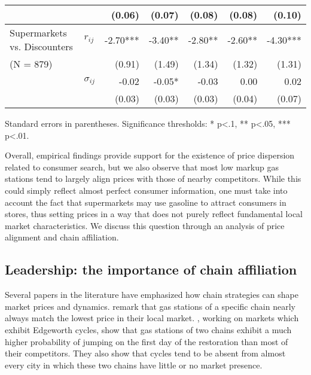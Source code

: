 \documentclass[english]{article}
\begin{document}
\begin{table}
\begin{threeparttable}
\begin{tabular}{rrrrrrr}
          &       & (0.06) & (0.07) & (0.08) & (0.08) & (0.10) \\
    \midrule
    \multicolumn{1}{l}{Supermarkets vs. Discounters} & \multicolumn{1}{l}{$r_{ij}$} & -2.70*** & -3.40** & -2.80** & -2.60** & -4.30*** \\
    \multicolumn{1}{l}{(N = 879)} &       & (0.91) & (1.49) & (1.34) & (1.32) & (1.31) \\
          & \multicolumn{1}{l}{$\sigma_{ij}$} & -0.02 & -0.05* & -0.03 & 0.00  & 0.02 \\
          &       & (0.03) & (0.03) & (0.03) & (0.04) & (0.07) \\
    \bottomrule
    \bottomrule
\end{tabular}
\begin{tablenotes}
      \small
      \item Standard errors in parentheses. Significance thresholds: * p<.1, ** p<.05, *** p<.01.
\end{tablenotes}
\end{threeparttable}
\end{table}

Overall, empirical findings provide support for the existence of price dispersion related to consumer search, but we also observe that most low markup gas stations tend to largely align prices with those of nearby competitors. While this could simply reflect almost perfect consumer information, one must take into account the fact that supermarkets may use gasoline to attract consumers in stores, thus setting prices in a way that does not purely reflect fundamental local market characteristics. We discuss this question through an analysis of price alignment and chain affiliation.

\subsection{Leadership: the importance of chain affiliation}

Several papers in the literature have emphasized how chain strategies can shape market prices and dynamics. \cite{HOS08} remark that gas stations of a specific chain nearly always match the lowest price in their local market. \cite{LEW12}, working on markets which exhibit Edgeworth cycles, show that gas stations of two chains exhibit a much higher probability of jumping on the first day of the restoration than most of their competitors. They also show that cycles tend to be absent from almost every city in which these two chains have little or no market presence.
\end{document}
